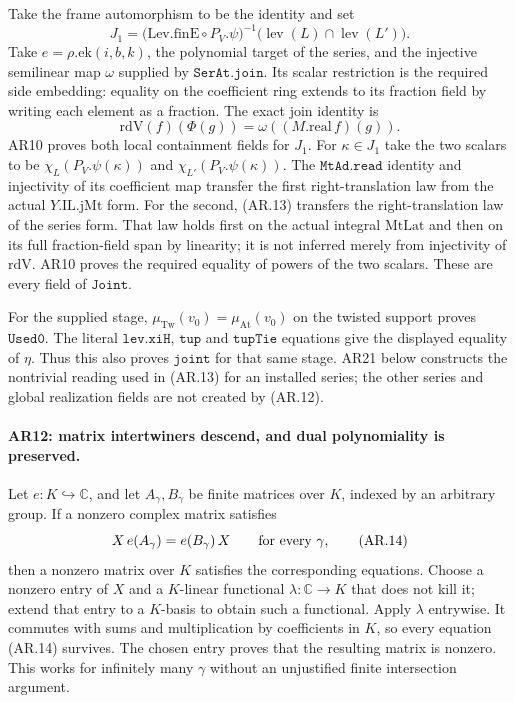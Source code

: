 Take the frame automorphism to be the identity and set
\[
 J_1=\bigl(\mathrm{Lev.finE}\circ P_V.\psi\bigr)^{-1}
                   \bigl(\operatorname{lev}(L)\cap\operatorname{lev}(L')\bigr).
                                                               \tag{AR.12}
\]
Take $e=\rho.\mathrm{ek}(i,b,k)$, the polynomial target of the
series, and the injective semilinear map $\omega$ supplied by
$\texttt{SerAt.join}$. Its scalar restriction is the required side
embedding: equality on the coefficient ring extends to its fraction
field by writing each element as a fraction.
The exact join identity is
\[
 \mathrm{rdV}(f)(\Phi(g))=\omega((M.\mathrm{real}\,f)(g)). \tag{AR.13}
\]
AR10 proves both local containment fields for $J_1$. For
$\kappa\in J_1$ take the two scalars to be
$\chi_L(P_V.\psi(\kappa))$ and $\chi_{L'}(P_V.\psi(\kappa))$.
The $\texttt{MtAd.read}$ identity and injectivity of its coefficient
map transfer the first right-translation law from the actual
$Y.\mathrm{IL.jMt}$ form. For the second, (AR.13) transfers the
right-translation law of the series form. That law holds first on
the actual integral $\mathrm{MtLat}$ and then on its full fraction-field
span by linearity; it is not inferred merely from injectivity of
$\mathrm{rdV}$. AR10 proves the required equality of powers of the
two scalars. These are every field of $\texttt{Joint}$.

For the supplied stage, $\mu_{\mathrm{Tw}}(v_0)=\mu_{\mathrm{At}}(v_0)$
on the twisted support proves $\texttt{Used0}$. The literal
$\texttt{lev.xiH}$, $\texttt{tup}$ and $\texttt{tupTie}$ equations
give the displayed equality of $\eta$. Thus this also proves
$\texttt{joint}$ for that same stage. AR21 below constructs the
nontrivial reading used in (AR.13) for an installed series; the other
series and global realization fields are not created by (AR.12).

\paragraph{AR12: matrix intertwiners descend, and dual polynomiality is preserved.}
Let $e:K\hookrightarrow\mathbb C$, and let $A_\gamma,B_\gamma$ be
finite matrices over $K$, indexed by an arbitrary group. If a nonzero
complex matrix satisfies
\[
 X\,e(A_\gamma)=e(B_\gamma)\,X\qquad\hbox{for every }\gamma,
                                                               \tag{AR.14}
\]
then a nonzero matrix over $K$ satisfies the corresponding equations.
Choose a nonzero entry of $X$ and a $K$-linear functional
$\lambda:\mathbb C\to K$ that does not kill it; extend that entry
to a $K$-basis to obtain such a functional. Apply $\lambda$ entrywise.
It commutes with sums and multiplication by coefficients in $K$,
so every equation (AR.14) survives. The chosen entry proves that the
resulting matrix is nonzero. This works for infinitely many
$\gamma$ without an unjustified finite intersection argument.

